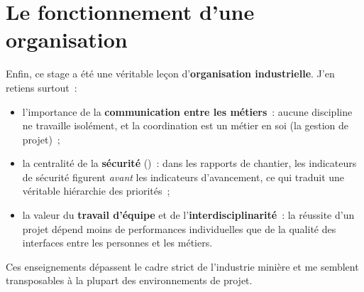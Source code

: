 \section{Le fonctionnement d'une organisation}

Enfin, ce stage a été une véritable leçon d'\textbf{organisation industrielle}. J'en retiens surtout~:

\begin{itemize}
\item l'importance de la \textbf{communication entre les métiers}~: aucune discipline ne travaille isolément, et la coordination est un métier en soi (la gestion de projet)~;
\item la centralité de la \textbf{sécurité} ()~: dans les rapports de chantier, les indicateurs de sécurité figurent \emph{avant} les indicateurs d'avancement, ce qui traduit une véritable hiérarchie des priorités~;
\item la valeur du \textbf{travail d'équipe} et de l'\textbf{interdisciplinarité}~: la réussite d'un projet dépend moins de performances individuelles que de la qualité des interfaces entre les personnes et les métiers.
\end{itemize}

Ces enseignements dépassent le cadre strict de l'industrie minière et me semblent transposables à la plupart des environnements de projet.
